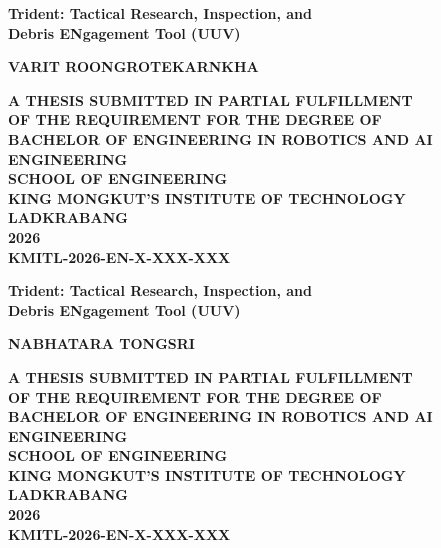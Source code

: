 \documentclass[12pt,a4paper]{report}
\begin{document}
\begin{titlepage}
	\centering
    \fontsize{18pt}{18pt}\bfseries Trident: Tactical Research, Inspection, and \\Debris ENgagement Tool (UUV) \\[1.5em]
    \vfill
    \begin{center}
        {\fontsize{18pt}{18pt}\bfseries VARIT ROONGROTEKARNKHA\par}
    \end{center}
    \vfill
    \vfill
    {\fontsize{18pt}{18pt}\bfseries
    A THESIS SUBMITTED IN PARTIAL FULFILLMENT \\ OF THE REQUIREMENT FOR THE DEGREE OF \\ BACHELOR OF ENGINEERING IN ROBOTICS AND AI ENGINEERING \\ SCHOOL OF ENGINEERING \\ KING MONGKUT'S INSTITUTE OF TECHNOLOGY LADKRABANG \\ 2026 \\ KMITL-2026-EN-X-XXX-XXX}
\end{titlepage}

\begin{titlepage}
	\centering
	\fontsize{18pt}{18pt}\bfseries Trident: Tactical Research, Inspection, and \\Debris ENgagement Tool (UUV) \\[1.5em]
	\vfill
	\begin{center}
		{\fontsize{18pt}{18pt}\bfseries NABHATARA TONGSRI\par}
	\end{center}
	\vfill
	\vfill
	{\fontsize{18pt}{18pt}\bfseries
		A THESIS SUBMITTED IN PARTIAL FULFILLMENT \\ OF THE REQUIREMENT FOR THE DEGREE OF \\ BACHELOR OF ENGINEERING IN ROBOTICS AND AI ENGINEERING \\ SCHOOL OF ENGINEERING \\ KING MONGKUT'S INSTITUTE OF TECHNOLOGY LADKRABANG \\ 2026 \\ KMITL-2026-EN-X-XXX-XXX}
\end{titlepage}
\end{document}
